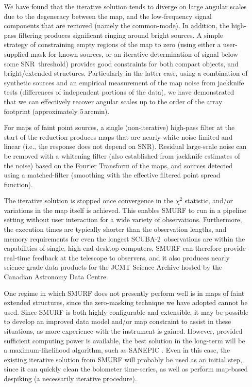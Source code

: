 \documentclass[useAMS,usenatbib,nofootinbib]{mn2e}
\newcommand{\snr}{SNR}
\newcommand{\scuba}{SCUBA-2}
\begin{document}
We have found that the iterative solution tends to diverge on large
angular scales due to the degeneracy between the map, and the
low-frequency signal components that are removed (namely the
common-mode). In addition, the high-pass filtering produces
significant ringing around bright sources. A simple strategy of
constraining empty regions of the map to zero (using either a
user-supplied mask for known sources, or an iterative determination of
signal below some \snr\ threshold) provides good constraints for both
compact objects, and bright/extended structures. Particularly in the
latter case, using a combination of synthetic sources and an empirical
measurement of the map noise from jackknife tests (differences of
independent portions of the data), we have demonstrated that we can
effectively recover angular scales up to the order of the array
footprint (approximately 5\,arcmin).

For maps of faint point sources, a single (non-iterative) high-pass
filter at the start of the reduction produces maps that are nearly
white-noise limited and linear (i.e., the response does not depend on
\snr). Residual large-scale noise can be removed with a whitening
filter (also established from jackknife estimates of the noise) based
on the Fourier Transform of the maps, and sources detected using a
matched-filter (smoothing with the effective filtered point spread
function).

The iterative solution is stopped once convergence in the $\chi^2$
statistic, and/or variations in the map itself is achieved. This
enables SMURF to run in a pipeline setting without user interaction
for a wide variety of observations. Furthermore, the execution times
are typically shorter than the observation lengths, and memory
requirements for even the longest \scuba\ observations are within the
capabilities of single, high-end desktop computers. SMURF can
therefore provide real-time feedback at the telescope to observers,
and it also produces nearly science-grade data products for the JCMT
Science Archive hosted by the Canadian Astronomy Data Centre.

One regime in which SMURF does not presently perform well is in maps
of faint extended structures, since the zero-masking technique we have
adopted cannot be used. Since SMURF is both highly configurable and
extensible, it may be possible to develop an improved data model
and/or map constraint to assist in these situations, as more
experience with the instrument is gained. However, provided sufficient
computing power is available, the best solution in the long-term will
be a maximum-likelihood algorithm, such as SANEPIC
\citep{patanchon2008}. Even in this case, the existing iterative
solution from SMURF will probably be used as an initial step, since it
can quickly clean the bolometer time-series, as well as perform
map-based despiking (a necessarily iterative procedure).
\end{document}
